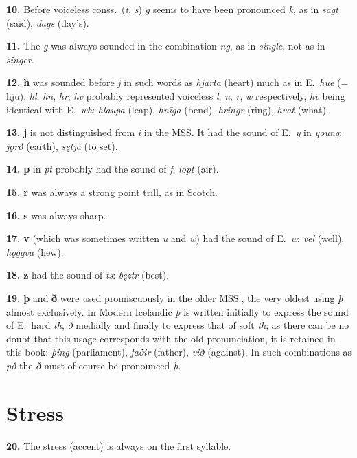\documentclass[12pt,letterpaper]{book}
\begin{document}
\textbf{10.} Before voiceless conss.\ (\textit{t}, \textit{s}) \textit{g} seems to have been
pronounced \textit{k}, as in \textit{sagt} (said), \textit{dags} (day's).

\textbf{11.} The \textit{g} was always sounded in the combination \textit{ng},
as in \textit{single}, not as in \textit{singer}.

\textbf{12.} {\bf h} was sounded before \textit{j} in such words as \textit{hjarta}
(heart) much as in E.\ \textit{hue} (= hjū).  \textit{hl}, \textit{hn}, \textit{hr},
\textit{hv} probably represented voiceless \textit{l}, \textit{n}, \textit{r},
\textit{w} respectively, \textit{hv} being identical with E.\ \textit{wh}:
\textit{hlaupa} (leap), \textit{hnīga} (bend), \textit{hringr} (ring), \textit{hvat}
(what).

\textbf{13.} {\bf j} is not distinguished from \textit{i} in the MSS\@.  It had the
sound of E.\ \textit{y} in \textit{young}: \textit{jǫrð} (earth), \textit{sętja}
(to set).

\textbf{14.} {\bf p} in \textit{pt} probably had the sound of \textit{f}: \textit{lopt} (air).

\textbf{15.} {\bf r} was always a strong point trill, as in Scotch.

\textbf{16.} {\bf s} was always sharp.

\textbf{17.} {\bf v} (which was sometimes written \textit{u} and \textit{w}) had the sound
of E.\ \textit{w}: \textit{vel} (well), \textit{hǫggva} (hew).

\textbf{18.} {\bf z} had the sound of \textit{ts}: \textit{bęztr} (best).

\textbf{19.} {\bf þ} and {\bf ð} were used promiscuously in the older MSS., the
very oldest using \textit{þ} almost exclusively.  In Modern Icelandic
\textit{þ} is written initially to express the sound of E.\ hard \textit{th},
\textit{ð} medially and finally to express that of soft \textit{th}; as there
can be no doubt that this usage corresponds with the old
pronunciation, it is retained in this book: \textit{þing} (parliament),
\textit{faðir} (father), \textit{við} (against).  In such combinations as
\textit{pð} the \textit{ð} must of course be pronounced \textit{þ}.

\section{Stress}

\textbf{20.} The stress (accent) is always on the first syllable.
\end{document}
